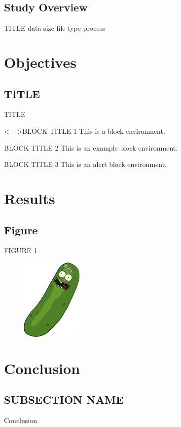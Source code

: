 \documentclass{beamer}
\begin{document}
\subsection{Study Overview} %
\begin{frame}{TITLE}
data size
file type
process
\end{frame}

\section{Objectives}

\subsection{TITLE}

\begin{frame}{TITLE}

\begin{block}<+->{BLOCK TITLE 1} 
This is a block environment.
\end{block}

\begin{example}{BLOCK TITLE 2}
This is an example block environment.
\end{example}

 \begin{alertblock}{BLOCK TITLE 3}
This is an alert block environment.
\end{alertblock}

\end{frame}

\section{Results} %

\subsection{Figure}

\begin{frame}{FIGURE 1 }

    \begin{figure}
      {
        \includegraphics[width=30mm,scale=0.5]{Plots/picklerick_6}
      }
    \end{figure}

\end{frame}



\section{Conclusion}

\subsection{SUBSECTION NAME}

\begin{frame}{Conclusion}

\end{frame}
\end{document}
